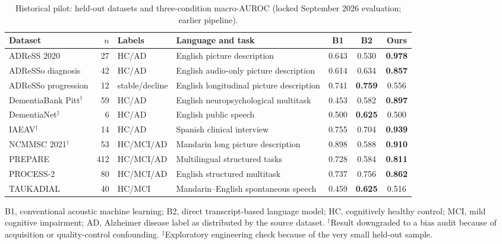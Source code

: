 \documentclass[pdflatex,sn-nature]{sn-jnl}
\begin{document}
\begin{table}[t]
\caption{Historical pilot: held-out datasets and three-condition macro-AUROC (locked September 2026 evaluation; earlier pipeline).}\label{tab:datasets}
\centering
\begin{threeparttable}
\scriptsize
\begin{tabularx}{\textwidth}{lrlXccc}
\toprule
Dataset & $n$ & Labels & Language and task & B1 & B2 & Ours \\
\midrule
ADReSS 2020 & 27 & HC/AD & English picture description & 0.643 & 0.530 & \textbf{0.978} \\
ADReSSo diagnosis & 42 & HC/AD & English audio-only picture description & 0.614 & 0.634 & \textbf{0.857} \\
ADReSSo progression & 12 & stable/decline & English longitudinal picture description & 0.741 & \textbf{0.759} & 0.556 \\
DementiaBank Pitt$^{\dagger}$ & 59 & HC/AD & English neuropsychological multitask & 0.453 & 0.582 & \textbf{0.897} \\
DementiaNet$^{\ddagger}$ & 6 & HC/AD & English public speech & 0.500 & \textbf{0.625} & 0.500 \\
IAEAV$^{\dagger}$ & 14 & HC/AD & Spanish clinical interview & 0.755 & 0.704 & \textbf{0.939} \\
NCMMSC 2021$^{\dagger}$ & 53 & HC/MCI/AD & Mandarin long picture description & 0.898 & 0.588 & \textbf{0.910} \\
PREPARE & 412 & HC/MCI/AD & Multilingual structured tasks & 0.728 & 0.584 & \textbf{0.811} \\
PROCESS-2 & 80 & HC/MCI/AD & English structured multitask & 0.737 & 0.756 & \textbf{0.862} \\
TAUKADIAL & 40 & HC/MCI & Mandarin--English spontaneous speech & 0.459 & \textbf{0.625} & 0.516 \\
\bottomrule
\end{tabularx}
\begin{tablenotes}[flushleft]
\footnotesize
\item B1, conventional acoustic machine learning; B2, direct transcript-based language model; HC, cognitively healthy control; MCI, mild cognitive impairment; AD, Alzheimer disease label as distributed by the source dataset. $^{\dagger}$Result downgraded to a bias audit because of acquisition or quality-control confounding. $^{\ddagger}$Exploratory engineering check because of the very small held-out sample.
\end{tablenotes}
\end{threeparttable}
\end{table}
\end{document}
